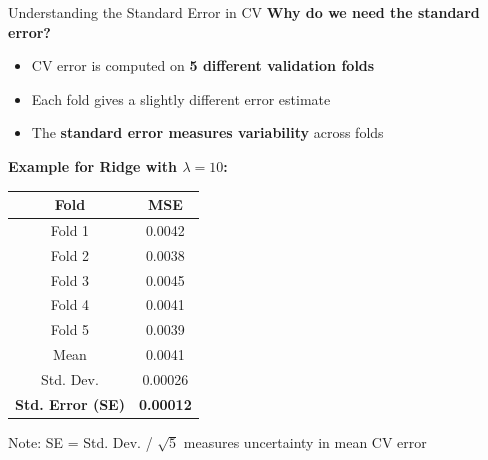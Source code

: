 \documentclass[10pt]{beamer}
\newcommand{\highlight}[1]{\textcolor{AccentOrange}{\textbf{#1}}}
\begin{document}
\begin{frame}{Understanding the Standard Error in CV}
\textbf{Why do we need the standard error?}

\vspace{0.5em}
\begin{itemize}
  \item CV error is computed on \highlight{5 different validation folds}
  \item Each fold gives a slightly different error estimate
  \item The \highlight{standard error measures variability} across folds
\end{itemize}

\vspace{1em}
\textbf{Example for Ridge with $\lambda = 10$:}

\begin{table}[h]
\centering
\small
\begin{tabular}{cc}
\toprule
\textbf{Fold} & \textbf{MSE} \\
\midrule
Fold 1 & 0.0042 \\
Fold 2 & 0.0038 \\
Fold 3 & 0.0045 \\
Fold 4 & 0.0041 \\
Fold 5 & 0.0039 \\
\midrule
Mean & 0.0041 \\
Std. Dev. & 0.00026 \\
\textbf{Std. Error (SE)} & \textbf{0.00012} \\
\bottomrule
\end{tabular}
\end{table}

\vspace{0.5em}
{\small Note: SE = Std. Dev. / $\sqrt{5}$ measures uncertainty in mean CV error}
\end{frame}

\end{document}
